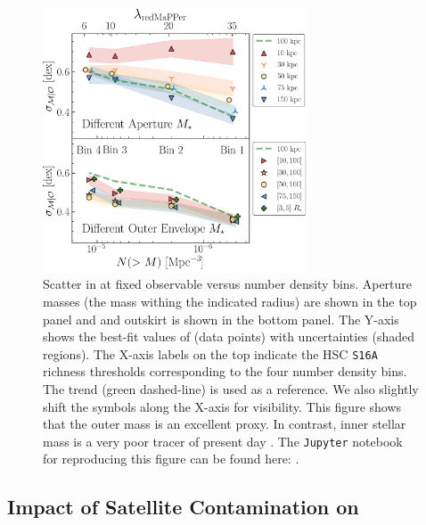 \documentclass[fleqn,usenatbib,useAMS]{mnras}
\begin{document}
\begin{CJK*}{UTF8}{gbsn}
\begin{figure}
    \centering
    \includegraphics[width=0.7\textwidth]{figure/fig_5}
    \caption{
        Scatter in \mvir{} at fixed observable versus number density bins. Aperture masses (the mass
        withing the indicated radius) are shown in the top panel and and outskirt \mstar{} is shown
        in the bottom panel. 
        The Y-axis shows the best-fit values of \scatterMhaloObsSym{} (data points) with
        uncertainties (shaded regions). 
        The X-axis labels on the top indicate the HSC \texttt{S16A} \redm{} richness thresholds
        corresponding to the four number density bins. The  trend (green dashed-line) is
        used as a reference.
        We also slightly shift the symbols along the X-axis for visibility. 
        This figure shows that the outer mass is an excellent \mvir{} proxy.
        In contrast, inner stellar mass is a very poor tracer of present day \mvir{}.
        The \texttt{Jupyter} notebook for reproducing this figure can be found here:
        \href{https://github.com/dr-guangtou/jianbing/blob/master/notebooks/figure/fig5.ipynb}{\faGithub}.
    }
    \label{fig:scatter_trend}
\end{figure}

\subsection{Impact of Satellite Contamination on \texorpdfstring{\dsigma{}}{DSigma}}
    \label{sec:satellite}


\end{CJK*}
\end{document}
